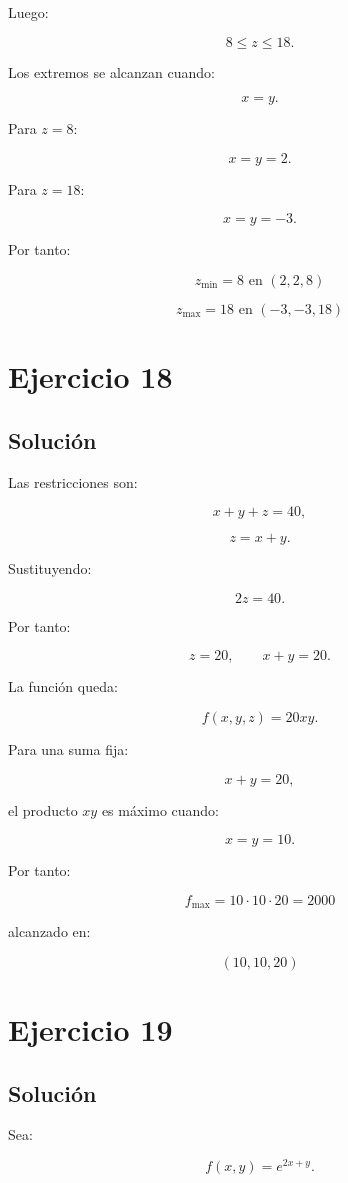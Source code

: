 \documentclass[11pt,a4paper]{article}
\begin{document}
Luego:

\[
8\leq z\leq18.
\]

Los extremos se alcanzan cuando:

\[
x=y.
\]

Para \(z=8\):

\[
x=y=2.
\]

Para \(z=18\):

\[
x=y=-3.
\]

Por tanto:

\[
\boxed{
z_{\min}=8
\text{ en }(2,2,8)
}
\]

\[
\boxed{
z_{\max}=18
\text{ en }(-3,-3,18)
}
\]

\section{Ejercicio 18}
\subsection{Solución}

Las restricciones son:

\[
x+y+z=40,
\]

\[
z=x+y.
\]

Sustituyendo:

\[
2z=40.
\]

Por tanto:

\[
z=20,
\qquad
x+y=20.
\]

La función queda:

\[
f(x,y,z)
=
20xy.
\]

Para una suma fija:

\[
x+y=20,
\]

el producto \(xy\) es máximo cuando:

\[
x=y=10.
\]

Por tanto:

\[
\boxed{
f_{\max}
=
10\cdot10\cdot20
=
2000
}
\]

alcanzado en:

\[
\boxed{
(10,10,20)
}
\]

\section{Ejercicio 19}
\subsection{Solución}

Sea:

\[
f(x,y)=e^{2x+y}.
\]
\end{document}
